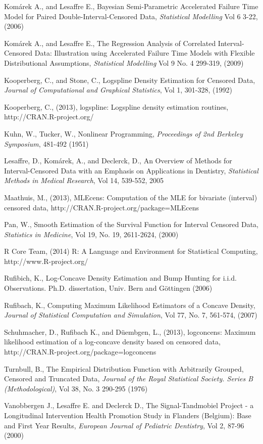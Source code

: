 \begin{thebibliography}{}
Kom\'arek A., and Lesaffre E., Bayesian Semi-Parametric Accelerated Failure Time Model for Paired Double-Interval-Censored Data, \emph{Statistical Modelling} Vol 6 3-22, (2006)

Kom\'arek A., and Lesaffre E., The Regression Analysis of Correlated Interval-Censored Data: Illustration using Accelerated Failure Time Models with Flexible Distributional Assumptions, \emph{Statistical Modelling} Vol 9 No. 4 299-319, (2009)


Kooperberg, C., and Stone, C., Logspline Density Estimation for Censored Data, \emph{Journal of Computational and Graphical Statistics}, Vol 1, 301-328, (1992)

  Kooperberg, C., (2013), logspline: Logspline density estimation routines, http://CRAN.R-project.org/


Kuhn, W., Tucker, W., Nonlinear Programming, \emph{Proceedings of 2nd Berkeley Symposium}, 481-492 (1951)

Lesaffre, D., Kom\'arek, A., and Declerck, D., An Overview of Methods for Interval-Censored Data with an Emphasis on Applications in Dentistry, \emph{Statistical Methods in Medical Research}, Vol 14, 539-552, 2005

Maathuis, M., (2013), MLEcens: Computation of the MLE for bivariate (interval) censored data, http://CRAN.R-project.org/package=MLEcens


Pan, W., Smooth Estimation of the Survival Function for Interval Censored Data, \emph{Statistics in Medicine}, Vol 19, No. 19, 2611-2624,  (2000)

R Core Team, (2014) R: A Language and Environment for Statistical Computing, http://www.R-project.org/

Rufibich, K., Log-Concave Density Estimation and Bump Hunting for i.i.d. Observations. Ph.D. dissertation, Univ. Bern and G\"ottingen (2006)


Rufibach, K., Computing Maximum Likelihood Estimators of a Concave Density, \emph{Journal of Statistical Computation and Simulation}, Vol 77, No. 7, 561-574, (2007)

Schuhmacher, D., Rufibach K., and D\"uembgen, L., (2013), logconcens: Maximum likelihood estimation of a log-concave density based on censored data, http://CRAN.R-project.org/package=logconcens


Turnbull, B., The Empirical Distribution Function with Arbitrarily Grouped, Censored and Truncated Data, \emph{Journal of the Royal Statistical Society. Series B (Methodological)}, Vol 38, No. 3 290-295 (1976)

Vanobbergen J., Lesaffre E. and Declerck D., The Signal-Tandmobiel {\textregistered} Project - a Longitudinal Intervention Health Promotion Study in Flanders (Belgium): Base and First Year Results, \emph{European Journal of Pediatric Dentistry}, Vol 2, 87-96 (2000) 


\end{thebibliography}
